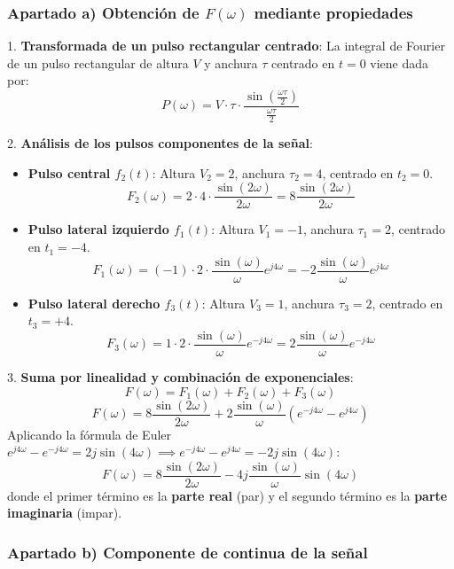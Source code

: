\newpage
\begin{resolucion}
\subsubsection*{Apartado a) Obtención de $F(\omega)$ mediante propiedades}

1. \textbf{Transformada de un pulso rectangular centrado}:
   La integral de Fourier de un pulso rectangular de altura $V$ y anchura $\tau$ centrado en $t=0$ viene dada por:
   \[
   P(\omega) = V \cdot \tau \cdot \frac{\sin\left(\frac{\omega\tau}{2}\right)}{\frac{\omega\tau}{2}}
   \]

2. \textbf{Análisis de los pulsos componentes de la señal}:
   \begin{itemize}
       \item \textbf{Pulso central $f_2(t)$}: Altura $V_2 = 2$, anchura $\tau_2 = 4$, centrado en $t_2 = 0$.
         \[
         F_2(\omega) = 2 \cdot 4 \cdot \frac{\sin(2\omega)}{2\omega} = 8 \frac{\sin(2\omega)}{2\omega}
         \]
       \item \textbf{Pulso lateral izquierdo $f_1(t)$}: Altura $V_1 = -1$, anchura $\tau_1 = 2$, centrado en $t_1 = -4$.
         \[
         F_1(\omega) = (-1) \cdot 2 \cdot \frac{\sin(\omega)}{\omega} e^{j4\omega} = -2 \frac{\sin(\omega)}{\omega} e^{j4\omega}
         \]
       \item \textbf{Pulso lateral derecho $f_3(t)$}: Altura $V_3 = 1$, anchura $\tau_3 = 2$, centrado en $t_3 = +4$.
         \[
         F_3(\omega) = 1 \cdot 2 \cdot \frac{\sin(\omega)}{\omega} e^{-j4\omega} = 2 \frac{\sin(\omega)}{\omega} e^{-j4\omega}
         \]
   \end{itemize}

3. \textbf{Suma por linealidad y combinación de exponenciales}:
   \[
   F(\omega) = F_1(\omega) + F_2(\omega) + F_3(\omega)
   \]
   \[
   F(\omega) = 8 \frac{\sin(2\omega)}{2\omega} + 2 \frac{\sin(\omega)}{\omega} \left( e^{-j4\omega} - e^{j4\omega} \right)
   \]
   Aplicando la fórmula de Euler $e^{j4\omega} - e^{-j4\omega} = 2j\sin(4\omega) \implies e^{-j4\omega} - e^{j4\omega} = -2j\sin(4\omega)$:
   \[
   F(\omega) = 8 \frac{\sin(2\omega)}{2\omega} - 4j \frac{\sin(\omega)}{\omega} \sin(4\omega)
   \]
   donde el primer término es la \textbf{parte real} (par) y el segundo término es la \textbf{parte imaginaria} (impar).

\newpage
\subsubsection*{Apartado b) Componente de continua de la señal}


\end{resolucion}
